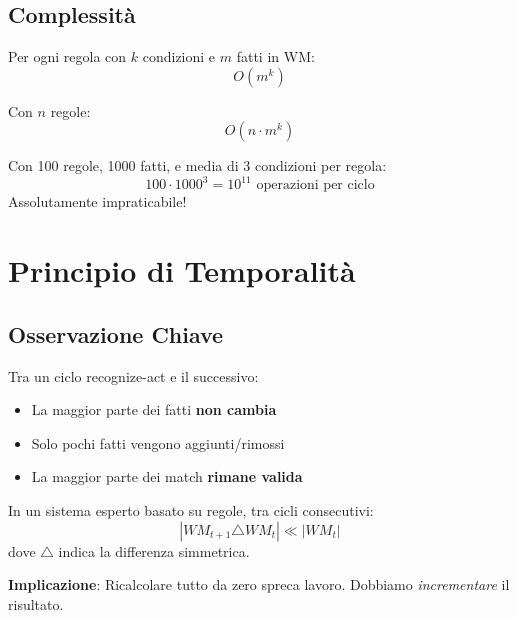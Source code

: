 \subsection{Complessità}

Per ogni regola con $k$ condizioni e $m$ fatti in WM:
\begin{equation}
O(m^k)
\end{equation}

Con $n$ regole:
\begin{equation}
O(n \cdot m^k)
\end{equation}

\begin{warningbox}
Con 100 regole, 1000 fatti, e media di 3 condizioni per regola:
\begin{equation}
100 \cdot 1000^3 = 10^{11} \text{ operazioni per ciclo}
\end{equation}
Assolutamente impraticabile!
\end{warningbox}

\section{Principio di Temporalità}

\subsection{Osservazione Chiave}

Tra un ciclo recognize-act e il successivo:
\begin{itemize}
\item La maggior parte dei fatti \textbf{non cambia}
\item Solo pochi fatti vengono aggiunti/rimossi
\item La maggior parte dei match \textbf{rimane valida}
\end{itemize}

\begin{definizione}
In un sistema esperto basato su regole, tra cicli consecutivi:
\begin{equation}
|WM_{t+1} \triangle WM_t| \ll |WM_t|
\end{equation}
dove $\triangle$ indica la differenza simmetrica.
\end{definizione}

\textbf{Implicazione}: Ricalcolare tutto da zero spreca lavoro. Dobbiamo \textit{incrementare} il risultato.

